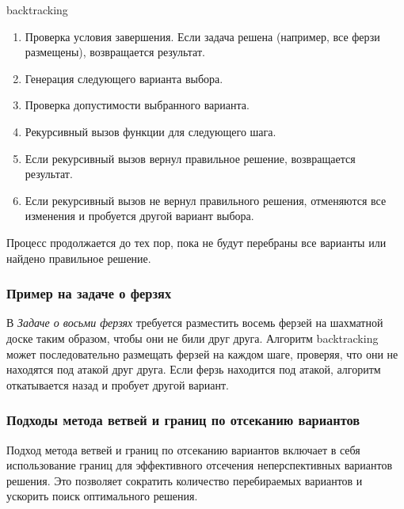     \begin{algorithm}
    \caption{backtracking}
    \begin{algorithmic}
        \begin{enumerate}
            \item Проверка условия завершения. Если задача решена (например, все ферзи размещены), возвращается результат.
            \item Генерация следующего варианта выбора.
            \item Проверка допустимости выбранного варианта.
            \item Рекурсивный вызов функции для следующего шага.
            \item Если рекурсивный вызов вернул правильное решение, возвращается результат.
            \item Если рекурсивный вызов не вернул правильного решения, отменяются все изменения и пробуется другой вариант выбора.
        \end{enumerate}

        \STATE Процесс продолжается до тех пор, пока не будут перебраны все варианты или найдено правильное решение.
    \end{algorithmic}
    \end{algorithm}
    
        \subsubsection{Пример на задаче о ферзях}

        В \textit{Задаче о восьми ферзях} требуется разместить восемь ферзей на шахматной доске таким образом, чтобы они не били друг друга. Алгоритм backtracking может последовательно размещать ферзей на каждом шаге, проверяя, что они не находятся под атакой друг друга. Если ферзь находится под атакой, алгоритм откатывается назад и пробует другой вариант.
        
        \subsubsection{Подходы метода ветвей и границ по отсеканию вариантов}

        Подход метода ветвей и границ по отсеканию вариантов включает в себя использование границ для эффективного отсечения неперспективных вариантов решения. Это позволяет сократить количество перебираемых вариантов и ускорить поиск оптимального решения.\\

